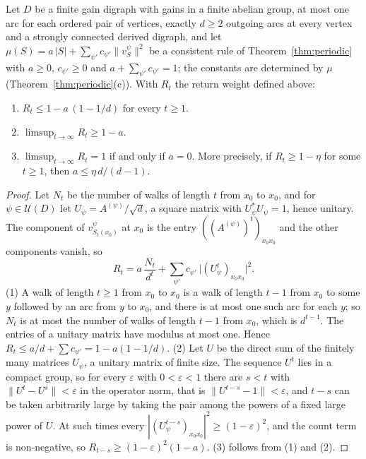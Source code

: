 \begin{corollary}\label{cor:return}
Let $D$ be a finite gain digraph with gains in a finite abelian group, at most one arc for each ordered pair of vertices, exactly $d\ge2$ outgoing arcs at every vertex and a strongly connected derived digraph, and let $\mu(S)=a\,|S|+\sum_{\psi'}c_{\psi'}\lVert v^\psi_S\rVert^2$ be a consistent rule of Theorem~\ref{thm:periodic} with $a\ge0$, $c_{\psi'}\ge0$ and $a+\sum_{\psi'}c_{\psi'}=1$; the constants are determined by $\mu$ (Theorem~\ref{thm:periodic}(c)). With $R_t$ the return weight defined above:
\begin{enumerate}
\item[(1)] $R_t\le1-a\,(1-1/d)$ for every $t\ge1$.
\item[(2)] $\limsup_{t\to\infty}R_t\ge1-a$.
\item[(3)] $\limsup_{t\to\infty}R_t=1$ if and only if $a=0$. More precisely, if $R_t\ge1-\eta$ for some $t\ge1$, then $a\le\eta\,d/(d-1)$.
\end{enumerate}
\end{corollary}
\begin{proof}
Let $N_t$ be the number of walks of length $t$ from $x_0$ to $x_0$, and for $\psi\in\mathcal{U}(D)$ let $U_\psi=A^{(\psi)}/\sqrt d$, a square matrix with $U_\psi^*U_\psi=1$, hence unitary. The component of $v^\psi_{S_t(x_0)}$ at $x_0$ is the entry $((A^{(\psi)})^t)_{x_0x_0}$ and the other components vanish, so
\[
R_t=a\,\frac{N_t}{d^t}+\sum_{\psi'}c_{\psi'}\,\bigl|(U_\psi^t)_{x_0x_0}\bigr|^2 .
\]
(1) A walk of length $t\ge1$ from $x_0$ to $x_0$ is a walk of length $t-1$ from $x_0$ to some $y$ followed by an arc from $y$ to $x_0$, and there is at most one such arc for each $y$; so $N_t$ is at most the number of walks of length $t-1$ from $x_0$, which is $d^{t-1}$. The entries of a unitary matrix have modulus at most one. Hence $R_t\le a/d+\sum c_{\psi'}=1-a(1-1/d)$. (2) Let $U$ be the direct sum of the finitely many matrices $U_\psi$, a unitary matrix of finite size. The sequence $U^t$ lies in a compact group, so for every $\varepsilon$ with $0<\varepsilon<1$ there are $s<t$ with $\lVert U^t-U^s\rVert<\varepsilon$ in the operator norm, that is $\lVert U^{t-s}-1\rVert<\varepsilon$, and $t-s$ can be taken arbitrarily large by taking the pair among the powers of a fixed large power of $U$. At such times every $|(U_\psi^{t-s})_{x_0x_0}|^2\ge(1-\varepsilon)^2$, and the count term is non-negative, so $R_{t-s}\ge(1-\varepsilon)^2(1-a)$. (3) follows from (1) and (2).
\end{proof}

